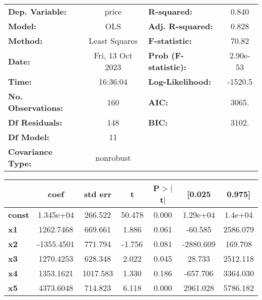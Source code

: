 \begin{center}
\begin{tabular}{lclc}
\toprule
\textbf{Dep. Variable:}    &      price       & \textbf{  R-squared:         } &     0.840   \\
\textbf{Model:}            &       OLS        & \textbf{  Adj. R-squared:    } &     0.828   \\
\textbf{Method:}           &  Least Squares   & \textbf{  F-statistic:       } &     70.82   \\
\textbf{Date:}             & Fri, 13 Oct 2023 & \textbf{  Prob (F-statistic):} &  2.90e-53   \\
\textbf{Time:}             &     16:36:04     & \textbf{  Log-Likelihood:    } &   -1520.5   \\
\textbf{No. Observations:} &         160      & \textbf{  AIC:               } &     3065.   \\
\textbf{Df Residuals:}     &         148      & \textbf{  BIC:               } &     3102.   \\
\textbf{Df Model:}         &          11      & \textbf{                     } &             \\
\textbf{Covariance Type:}  &    nonrobust     & \textbf{                     } &             \\
\bottomrule
\end{tabular}
\begin{tabular}{lcccccc}
               & \textbf{coef} & \textbf{std err} & \textbf{t} & \textbf{P$> |$t$|$} & \textbf{[0.025} & \textbf{0.975]}  \\
\midrule
\textbf{const} &    1.345e+04  &      266.522     &    50.478  &         0.000        &     1.29e+04    &      1.4e+04     \\
\textbf{x1}    &    1262.7468  &      669.661     &     1.886  &         0.061        &      -60.585    &     2586.079     \\
\textbf{x2}    &   -1355.4501  &      771.794     &    -1.756  &         0.081        &    -2880.609    &      169.708     \\
\textbf{x3}    &    1270.4253  &      628.348     &     2.022  &         0.045        &       28.733    &     2512.118     \\
\textbf{x4}    &    1353.1621  &     1017.583     &     1.330  &         0.186        &     -657.706    &     3364.030     \\
\textbf{x5}    &    4373.6048  &      714.823     &     6.118  &         0.000        &     2961.028    &     5786.182     \\

\end{tabular}
\end{center}
